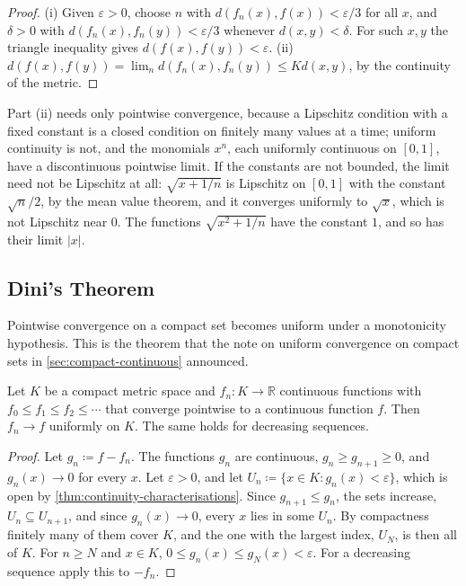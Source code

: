 \begin{proof}
(i) Given $\varepsilon>0$, choose $n$ with $d(f_n(x),f(x))<\varepsilon/3$ for all $x$, and $\delta>0$ with $d(f_n(x),f_n(y))<\varepsilon/3$ whenever $d(x,y)<\delta$. For such $x,y$ the triangle inequality gives $d(f(x),f(y))<\varepsilon$. (ii) $d(f(x),f(y))=\lim_nd(f_n(x),f_n(y))\le Kd(x,y)$, by the continuity of the metric.
\end{proof}

Part (ii) needs only pointwise convergence, because a Lipschitz condition with a fixed constant is a closed condition on finitely many values at a time; uniform continuity is not, and the monomials $x^n$, each uniformly continuous on $[0,1]$, have a discontinuous pointwise limit. If the constants are not bounded, the limit need not be Lipschitz at all: $\sqrt{x+1/n}$ is Lipschitz on $[0,1]$ with the constant $\sqrt n/2$, by the mean value theorem, and it converges uniformly to $\sqrt x$, which is not Lipschitz near $0$. The functions $\sqrt{x^2+1/n}$ have the constant $1$, and so has their limit $|x|$.

\subsection{Dini's Theorem}

Pointwise convergence on a compact set becomes uniform under a monotonicity hypothesis. This is the theorem that the note on uniform convergence on compact sets in \cref{sec:compact-continuous} announced.

\begin{theorem}[Dini]
\label{thm:dini}
Let $K$ be a compact metric space and $f_n\colon K\to\mathbb R$ continuous functions with $f_0\le f_1\le f_2\le\cdots$ that converge pointwise to a continuous function $f$. Then $f_n\to f$ uniformly on $K$. The same holds for decreasing sequences.
\end{theorem}

\begin{proof}
Let $g_n\coloneqq f-f_n$. The functions $g_n$ are continuous, $g_n\ge g_{n+1}\ge0$, and $g_n(x)\to0$ for every $x$. Let $\varepsilon>0$, and let $U_n\coloneqq\{x\in K: g_n(x)<\varepsilon\}$, which is open by \cref{thm:continuity-characterisations}. Since $g_{n+1}\le g_n$, the sets increase, $U_n\subseteq U_{n+1}$, and since $g_n(x)\to0$, every $x$ lies in some $U_n$. By compactness finitely many of them cover $K$, and the one with the largest index, $U_N$, is then all of $K$. For $n\ge N$ and $x\in K$, $0\le g_n(x)\le g_N(x)<\varepsilon$. For a decreasing sequence apply this to $-f_n$.
\end{proof}

